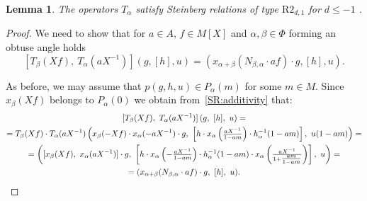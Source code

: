 \documentclass[oneside, 8pt]{amsart}
\newtheorem{lemma}{Lemma}
\theoremstyle{remark}
\theoremstyle{definition}
\numberwithin{lemma}{section}
\numberwithin{prop}{section}
\numberwithin{corollary}{section}
\numberwithin{equation}{section}
\begin{document}
\begin{lemma} \label{R3_leqm1_1} The operators $T_\alpha$ satisfy Steinberg relations of type $\mathrm{R2}_{d, 1}$ for $d \leq -1$ . \end{lemma}
\begin{proof} We need to show that for $a\in A$, $f \in M[X]$ and $\alpha, \beta \in \Phi$ forming an obtuse angle holds
 \[ [T_\beta(Xf),\ T_\alpha(aX^{-1})] (g, [h], u) = \left(x_{\alpha+\beta}(N_{\beta,\alpha} \cdot af) \cdot g, [h], u\right). \]

As before, we may assume that $p(g, h, u) \in P_\alpha(m)$ for some $m \in M$.
Since $x_\beta(Xf)$ belongs to $P_\alpha(0)$ we obtain from~\cref{SR:additivity} that:
\begin{multline} \nonumber [T_\beta(Xf),\ T_\alpha(aX^{-1})] \left(g,\ [h],\ u\right) = \\ 
= T_\beta(Xf) \cdot T_\alpha(aX^{-1}) \left(x_{\beta}(-Xf) \cdot x_\alpha(-aX^{-1})\cdot g,\ \left[h \cdot x_\alpha\left(\tfrac{aX^{-1}}{1 - am}\right) \cdot h^{-1}_\alpha(1-am)\right],\ u(1-am)\right) = \\ = \left([x_\beta(Xf),\ x_\alpha(aX^{-1})] \cdot g,\ \left[h \cdot x_\alpha\left(-\tfrac{aX^{-1}}{1-am}\right) \cdot h^{-1}_\alpha(1-am) \cdot x_\alpha\left(\tfrac{aX^{-1}}{1 + \tfrac{am}{1-am}}\right)\right],\ u \right) = \\ = (x_{\alpha+\beta}(N_{\beta,\alpha} \cdot af) \cdot g,\ [h],\ u). \qedhere \end{multline} \end{proof}
\end{document}
